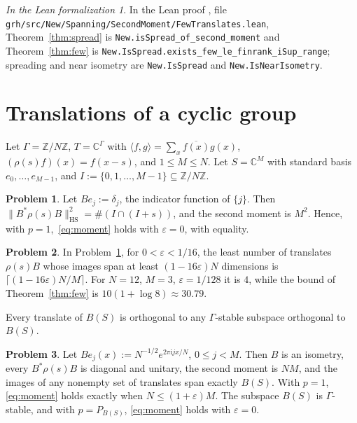 \documentclass[reqno]{amsart}
\numberwithin{equation}{section}
\theoremstyle{definition}
\newtheorem{problem}{Problem}[section]
\theoremstyle{plain}
\theoremstyle{remark}
\newtheorem*{leanremark}{In the Lean formalization}
\newcommand{\Z}{\mathbb{Z}}
\newcommand{\C}{\mathbb{C}}
\newcommand{\HS}{\mathrm{HS}}
\newcommand{\tl}[1]{\texttt{#1}}
\begin{document}
\begin{leanremark}
In the Lean proof \cite{GL}, file \tl{grh/src/New/Spanning/SecondMoment/FewTranslates.lean}, Theorem~\ref{thm:spread} is \tl{New.isSpread\_of\_second\_moment} and Theorem~\ref{thm:few} is \tl{New.IsSpread.exists\_few\_le\_finrank\_iSup\_range}; spreading and near isometry are \tl{New.IsSpread} and \tl{New.IsNearIsometry}.
\end{leanremark}

\section{Translations of a cyclic group}\label{sec:cyclic}

Let \(\Gamma = \Z/N\Z\), \(T = \C^{\Gamma}\) with \(\langle f, g \rangle = \sum_x \overline{f(x)} g(x)\), \((\rho(s)f)(x) = f(x - s)\), and \(1 \le M \le N\).  Let \(S = \C^M\) with standard basis \(e_0, \dots, e_{M-1}\), and \(I := \{0, 1, \dots, M-1\} \subseteq \Z/N\Z\).

\begin{problem}\label{pr:points}
Let \(Be_j := \delta_j\), the indicator function of \(\{j\}\).  Then \(\lVert B^*\rho(s)B \rVert_\HS^2 = \#(I \cap (I + s))\), and the second moment is \(M^2\).  Hence, with \(p = 1\),~\eqref{eq:moment} holds with \(\varepsilon = 0\), with equality.
\end{problem}

\begin{problem}\label{pr:points-count}
In Problem~\ref{pr:points}, for \(0 < \varepsilon < 1/16\), the least number of translates \(\rho(s)B\) whose images span at least \((1 - 16\varepsilon)N\) dimensions is \(\lceil (1 - 16\varepsilon)N/M \rceil\).  For \(N = 12\), \(M = 3\), \(\varepsilon = 1/128\) it is \(4\), while the bound of Theorem~\ref{thm:few} is \(10(1 + \log 8) \approx 30.79\).
\end{problem}

Every translate of \(B(S)\) is orthogonal to any \(\Gamma\)-stable subspace orthogonal to \(B(S)\).

\begin{problem}\label{pr:frequencies}
Let \(Be_j(x) := N^{-1/2}e^{2\pi \mathrm{i} jx/N}\), \(0 \le j < M\).  Then \(B\) is an isometry, every \(B^*\rho(s)B\) is diagonal and unitary, the second moment is \(NM\), and the images of any nonempty set of translates span exactly \(B(S)\).  With \(p = 1\), \eqref{eq:moment} holds exactly when \(N \le (1 + \varepsilon)M\).  The subspace \(B(S)\) is \(\Gamma\)-stable, and with \(p = P_{B(S)}\), \eqref{eq:moment} holds with \(\varepsilon = 0\).
\end{problem}
\end{document}

